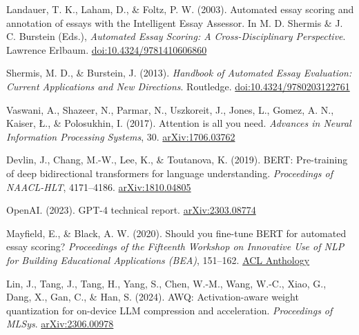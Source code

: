 \documentclass[12pt]{article}
\begin{document}
\begin{enumerate}[label={[\arabic*]}, leftmargin=*, itemsep=4pt]

    \item \hypertarget{ref1}{} Landauer, T. K., Laham, D., \& Foltz, P. W. (2003). Automated essay scoring and annotation of essays with the Intelligent Essay Assessor. In M. D. Shermis \& J. C. Burstein (Eds.), \textit{Automated Essay Scoring: A Cross-Disciplinary Perspective}. Lawrence Erlbaum. \href{https://doi.org/10.4324/9781410606860}{doi:10.4324/9781410606860}

    \item \hypertarget{ref2}{} Shermis, M. D., \& Burstein, J. (2013). \textit{Handbook of Automated Essay Evaluation: Current Applications and New Directions}. Routledge. \href{https://doi.org/10.4324/9780203122761}{doi:10.4324/9780203122761}

    \item \hypertarget{ref3}{} Vaswani, A., Shazeer, N., Parmar, N., Uszkoreit, J., Jones, L., Gomez, A. N., Kaiser, \L., \& Polosukhin, I. (2017). Attention is all you need. \textit{Advances in Neural Information Processing Systems}, 30. \href{https://arxiv.org/abs/1706.03762}{arXiv:1706.03762}

    \item \hypertarget{ref4}{} Devlin, J., Chang, M.-W., Lee, K., \& Toutanova, K. (2019). BERT: Pre-training of deep bidirectional transformers for language understanding. \textit{Proceedings of NAACL-HLT}, 4171--4186. \href{https://arxiv.org/abs/1810.04805}{arXiv:1810.04805}

    \item \hypertarget{ref5}{} OpenAI. (2023). GPT-4 technical report. \href{https://arxiv.org/abs/2303.08774}{arXiv:2303.08774}

    \item \hypertarget{ref6}{} Mayfield, E., \& Black, A. W. (2020). Should you fine-tune BERT for automated essay scoring? \textit{Proceedings of the Fifteenth Workshop on Innovative Use of NLP for Building Educational Applications (BEA)}, 151--162. \href{https://aclanthology.org/2020.bea-1.15/}{ACL Anthology}

    \item \hypertarget{ref7}{} Lin, J., Tang, J., Tang, H., Yang, S., Chen, W.-M., Wang, W.-C., Xiao, G., Dang, X., Gan, C., \& Han, S. (2024). AWQ: Activation-aware weight quantization for on-device LLM compression and acceleration. \textit{Proceedings of MLSys}. \href{https://arxiv.org/abs/2306.00978}{arXiv:2306.00978}


\end{enumerate}
\end{document}
